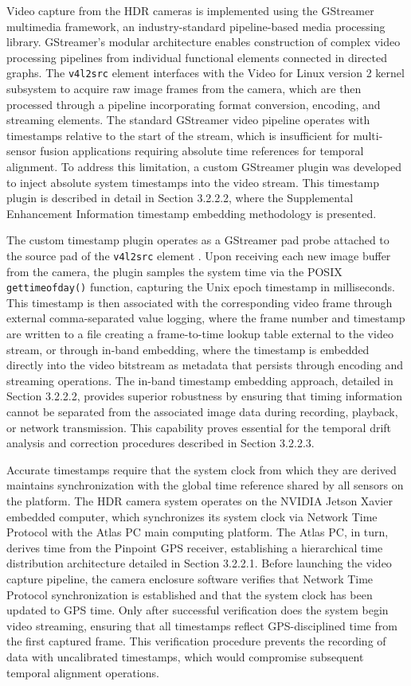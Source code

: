 \documentclass{erauthesis}
\begin{document}
Video capture from the \ac{HDR} cameras is implemented using the GStreamer multimedia framework, an industry-standard pipeline-based media processing library.
GStreamer's modular architecture enables construction of complex video processing pipelines from individual functional elements connected in directed graphs.
The \texttt{v4l2src} element interfaces with the Video for Linux version 2 kernel subsystem to acquire raw image frames from the camera, which are then processed through a pipeline incorporating format conversion, encoding, and streaming elements.
The standard GStreamer video pipeline operates with timestamps relative to the start of the stream, which is insufficient for multi-sensor fusion applications requiring absolute time references for temporal alignment.
To address this limitation, a custom GStreamer plugin was developed to inject absolute system timestamps into the video stream.
This timestamp plugin is described in detail in Section 3.2.2.2, where the Supplemental Enhancement Information timestamp embedding methodology is presented.

The custom timestamp plugin operates as a GStreamer pad probe attached to the source pad of the \texttt{v4l2src} element \cite{thompson2023}.
Upon receiving each new image buffer from the camera, the plugin samples the system time via the POSIX \texttt{gettimeofday()} function, capturing the Unix epoch timestamp in milliseconds.
This timestamp is then associated with the corresponding video frame through external comma-separated value logging, where the frame number and timestamp are written to a file creating a frame-to-time lookup table external to the video stream, or through in-band embedding, where the timestamp is embedded directly into the video bitstream as metadata that persists through encoding and streaming operations.
The in-band timestamp embedding approach, detailed in Section 3.2.2.2, provides superior robustness by ensuring that timing information cannot be separated from the associated image data during recording, playback, or network transmission.
This capability proves essential for the temporal drift analysis and correction procedures described in Section 3.2.2.3.

Accurate timestamps require that the system clock from which they are derived maintains synchronization with the global time reference shared by all sensors on the platform.
The \ac{HDR} camera system operates on the NVIDIA Jetson Xavier embedded computer, which synchronizes its system clock via Network Time Protocol with the Atlas PC main computing platform.
The Atlas PC, in turn, derives time from the Pinpoint \ac{GPS} receiver, establishing a hierarchical time distribution architecture detailed in Section 3.2.2.1.
Before launching the video capture pipeline, the camera enclosure software verifies that Network Time Protocol synchronization is established and that the system clock has been updated to \ac{GPS} time.
Only after successful verification does the system begin video streaming, ensuring that all timestamps reflect \ac{GPS}-disciplined time from the first captured frame.
This verification procedure prevents the recording of data with uncalibrated timestamps, which would compromise subsequent temporal alignment operations.
\end{document}

